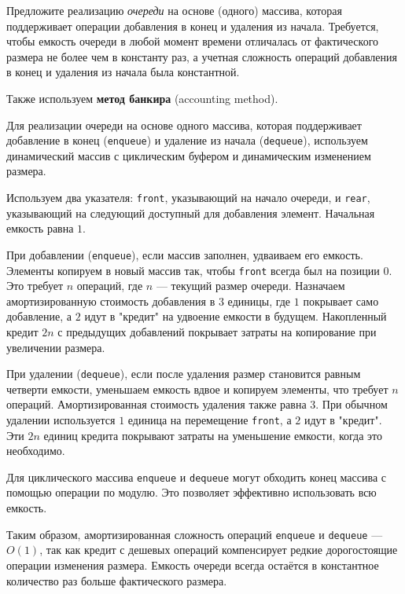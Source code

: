 \documentclass[11pt]{article}
\begin{document}
\begin{problem}{20}
Предложите реализацию \emph{очереди} на основе (одного) массива, которая поддерживает операции добавления в конец и удаления из начала. Требуется, чтобы емкость очереди в любой момент времени отличалась от фактического размера не более чем в константу раз, а учетная сложность операций добавления в конец и удаления из начала была константной.
\end{problem}

\begin{solution}
	Также используем \textbf{метод банкира} (accounting method).

	Для реализации очереди на основе одного массива, которая поддерживает добавление в конец (\texttt{enqueue}) и удаление из начала (\texttt{dequeue}), используем динамический массив с циклическим буфером и динамическим изменением размера.

	Используем два указателя: \texttt{front}, указывающий на начало очереди, и \texttt{rear}, указывающий на следующий доступный для добавления элемент. Начальная емкость равна \(1\).

	При добавлении (\texttt{enqueue}), если массив заполнен, удваиваем его емкость. Элементы копируем в новый массив так, чтобы \texttt{front} всегда был на позиции \(0\). Это требует \(n\) операций, где \(n\) — текущий размер очереди. Назначаем амортизированную стоимость добавления в \(3\) единицы, где \(1\) покрывает само добавление, а \(2\) идут в "кредит" на удвоение емкости в будущем. Накопленный кредит \(2n\) с предыдущих добавлений покрывает затраты на копирование при увеличении размера.

	При удалении (\texttt{dequeue}), если после удаления размер становится равным четверти емкости, уменьшаем емкость вдвое и копируем элементы, что требует \(n\) операций. Амортизированная стоимость удаления также равна \(3\). При обычном удалении используется \(1\) единица на перемещение \texttt{front}, а \(2\) идут в "кредит". Эти \(2n\) единиц кредита покрывают затраты на уменьшение емкости, когда это необходимо.

	Для циклического массива \texttt{enqueue} и \texttt{dequeue} могут обходить конец массива с помощью операции по модулю. Это позволяет эффективно использовать всю емкость.

	Таким образом, амортизированная сложность операций \texttt{enqueue} и \texttt{dequeue} — \(O(1)\), так как кредит с дешевых операций компенсирует редкие дорогостоящие операции изменения размера. Емкость очереди всегда остаётся в константное количество раз больше фактического размера.

\end{solution}
\end{document}
